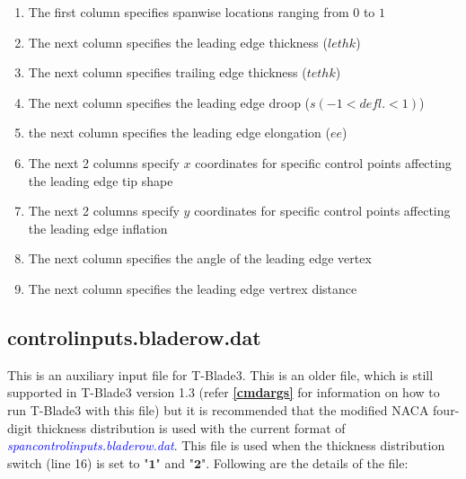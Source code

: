 \documentclass[8pt]{article}
\begin{document}
\begin{itemize}[leftmargin=*]
\begin{enumerate}[label=\alph*]
        \item The first column specifies spanwise locations ranging from $0$ to $1$
        \item The next column specifies the leading edge thickness ($lethk$)
        \item The next column specifies trailing edge thickness ($tethk$)
        \item The next column specifies the leading edge droop ($s(-1<defl.<1)$)
        \item the next column specifies the leading edge elongation ($ee$)
        \item The next 2 columns specify $x$ coordinates for specific control points affecting the leading edge tip shape
        \item The next 2 columns specify $y$ coordinates for specific control points affecting the leading edge inflation
        \item The next column specifies the angle of the leading edge vertex 
        \item The next column specifies the leading edge vertrex distance
    \end{enumerate}
\end{itemize}

\subsection{controlinputs.bladerow.dat}\label{auxinput2}
\noindent
This is an auxiliary input file for T-Blade3. This is an older file, which is still supported in T-Blade3 version 1.3 (refer \textbf{\ref{cmdargs}} for information on how to run T-Blade3 with this file) but it is recommended that the modified NACA four-digit thickness distribution is used with the current format of \textit{\textcolor{blue}{spancontrolinputs.bladerow.dat}}. This file is used when the thickness distribution switch (line 16) is set to "$\mathbf{1}$" and "$\mathbf{2}$". Following are the details of the file:
\end{document}
